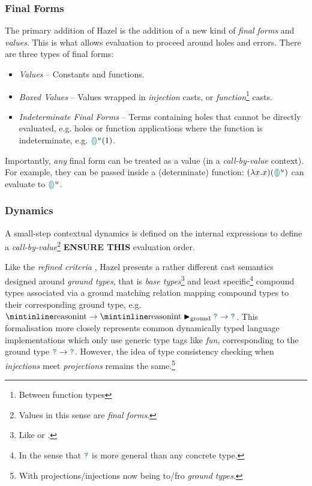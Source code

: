 \subsubsection{Final Forms}\label{sec:HazelFinalForms}
The primary addition of Hazel is the addition of a new kind of \textit{final forms} and \textit{values}. This is what allows evaluation to proceed around holes and errors. There are three types of final forms:
\begin{itemize}
\item \textit{Values} -- Constants and functions.
\item \textit{Boxed Values} -- Values wrapped in \textit{injection} casts, or \textit{function}\footnote{Between function types} casts.
\item \textit{Indeterminate Final Forms} -- Terms containing holes that cannot be directly evaluated, e.g. holes or function applications where the function is indeterminate, e.g. ${\color{teal}\llparenthesis}  {\color{teal}\rrparenthesis}^u(1)$.
\end{itemize}
 Importantly, \textit{any} final form can be treated as a value (in a \textit{call-by-value} context). For example, they can be passed inside a (determinate) function: $(\lambda x. x)({\color{teal}\llparenthesis}  {\color{teal}\rrparenthesis}^u)$ can evaluate to ${\color{teal}\llparenthesis}  {\color{teal}\rrparenthesis}^u$.

\subsubsection{Dynamics}\label{sec:HazelDynamics}
A small-step contextual dynamics \cite[ch. 5]{PracticalFoundations} is defined on the internal expressions to define a \textit{call-by-value}\footnote{Values in this sense are \textit{final forms}.} \textbf{ENSURE THIS} evaluation order. 

Like the \textit{refined criteria}  \cite{GradualRefined}, Hazel presents a rather different cast semantics designed around \textit{ground types}, that is \textit{base types}\footnote{Like  or .} and least specific\footnote{In the sense that ${\color{teal}\texttt{?}}$ is more general than any concrete type.} compound types associated via a ground matching relation mapping compound types to their corresponding ground type, e.g. $\code{int} \to \code{int} \groundmatch \dyn \to \dyn$. This formalisation more closely represents common dynamically typed language implementations which only use generic type tags like \textit{fun}, corresponding to the ground type ${\color{teal}\texttt{?}} \to {\color{teal}\texttt{?}}$. However, the idea of type consistency checking when \textit{injections} meet \textit{projections} remains the same.\footnote{With projections/injections now being to/fro \textit{ground types}.}


